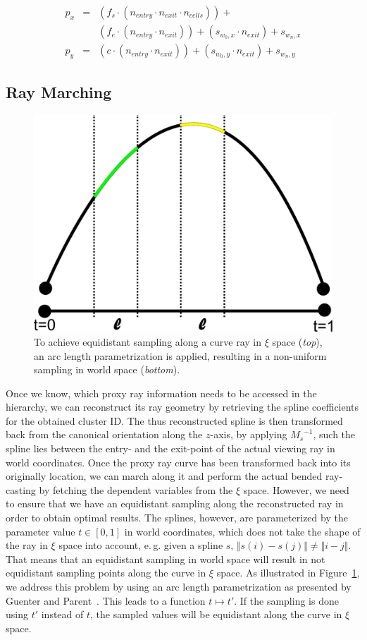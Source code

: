\documentclass[review,journal]{vgtc}         %
\begin{document}
\begin{eqnarray*}
p_x & = &(f_s \cdot (n_{entry} \cdot n_{exit} \cdot n_{cells})) + \\
	&  &(f_e \cdot (n_{entry} \cdot n_{exit})) + (s_{w_0,x} \cdot n_{exit}) + s_{w_n,x}\\
p_y & = &(c   \cdot (n_{entry} \cdot n_{exit})) + (s_{w_0,y} \cdot n_{exit}) + s_{w_n,y}
\end{eqnarray*}


\subsection{Ray Marching}

\begin{figure}[t]
\centering
\includegraphics[width=0.5\linewidth]{figures/arclength}
\caption{To achieve equidistant sampling along a curve ray in $\xi$ space ({\it top}), an arc length parametrization is applied, resulting in a non-uniform sampling in world space ({\it bottom}).}
\label{fig:arclength}
\end{figure}

Once we know, which proxy ray information needs to be accessed in the hierarchy, we can reconstruct its ray geometry by retrieving the spline coefficients for the obtained cluster ID. The thus reconstructed spline is then transformed back from the canonical orientation along the $z$-axis, by applying ${M_s}^{-1}$, such the spline lies between the entry- and the exit-point of the actual viewing ray in world coordinates. Once the proxy ray curve has been transformed back into its originally location, we can march along it and perform the actual bended ray-casting by fetching the dependent variables from the $\xi$ space. However, we need to ensure that we have an equidistant sampling along the reconstructed ray in order to obtain optimal results. The splines, however, are parameterized by the parameter value $t \in [0,1]$ in world coordinates, which does not take the shape of the ray in $\xi$ space into account, e.\,g. given a spline $s$, $\Vert s(i) - s(j) \Vert \neq \Vert i - j \Vert$. That means that an equidistant sampling in world space will result in not equidistant sampling points along the curve in $\xi$ space. As illustrated in Figure~\ref{fig:arclength}, we address this problem by using an arc length parametrization as presented by Guenter and Parent~\cite{guenter90arclength}. This leads to a function $t \mapsto t'$. If the sampling is done using $t'$ instead of $t$, the sampled values will be equidistant along the curve in $\xi$ space.
\end{document}

